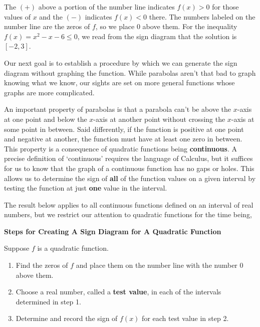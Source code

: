 The $(+)$ above a portion of the number line indicates $f(x) > 0$ for those values of $x$ and the $(-)$ indicates $f(x) < 0$ there.  The numbers labeled on the number line are the zeros of $f$, so we place $0$ above them.  For the inequality $f(x) = x^2-x-6 \leq 0$, we read from the sign diagram that the solution is $[-2,3]$.  

\medskip

Our next goal is to establish a procedure by which we can generate the sign diagram without graphing the function.  While parabolas aren't that bad to graph knowing what we know, our sights are set on more general functions whose graphs are more complicated.  

\medskip
\enlargethispage{.in}

An important property of parabolas is that a parabola can't be above the $x$-axis at one point and below the $x$-axis at another point without crossing the $x$-axis at some point in between. Said differently, if the function is positive at one point and negative at another, the function must have at least one zero in between.  This property is a consequence of quadratic functions being \textbf{continuous}.  A precise definition of `continuous' requires the language of Calculus, but it suffices for us to know that the graph of a continuous function has no gaps or holes.   This allows us to determine the sign of \textbf{all} of the function values on a given interval by testing the function at just \textbf{one} value in the interval.  

\medskip

The result below applies to all continuous functions defined on an interval of real numbers, but we restrict our attention to quadratic functions for the time being,

\medskip

\colorbox{ResultColor}{\bbm

\centerline{\textbf{Steps for Creating A Sign Diagram for A Quadratic Function}} 

\smallskip

Suppose $f$ is a quadratic function.

\begin{enumerate}

\item  Find the zeros of $f$ and place them on the number line with the number $0$ above them.

\item  Choose a real number, called a \textbf{test value}, in each of the intervals determined in step 1. 

\item  Determine and record the sign of $f(x)$ for each test value in step 2.

\end{enumerate}

\ebm}

